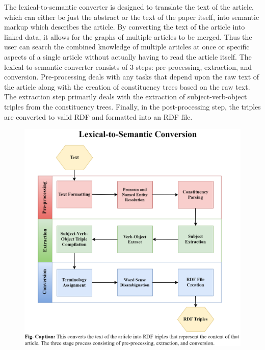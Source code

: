 \documentclass[12pt]{article}
\begin{document}
	\quad The lexical-to-semantic converter is designed to translate the text of the article, which can either be just the abstract or the text of the paper itself, into semantic markup which describes the article. By converting the text of the article into linked data, it allows for the graphs of multiple articles to be merged. Thus the user can search the combined knowledge of multiple articles at once or specific aspects of a single article without actually having to read the article itself. The lexical-to-semantic converter consists of 3 steps: pre-processing, extraction, and conversion. Pre-processing deals with any tasks that depend upon the raw text of the article along with the creation of constituency trees based on the raw text. The extraction step primarily deals with the extraction of subject-verb-object triples from the constituency trees. Finally, in the post-processing step, the triples are converted to valid RDF and formatted into an RDF file. 
	\begin{figure}[h!]
		\centering
		\includegraphics[scale=0.20]{NaturalLanguageProcessing_vJSHS2.0}
	\end{figure}
\end{document}
